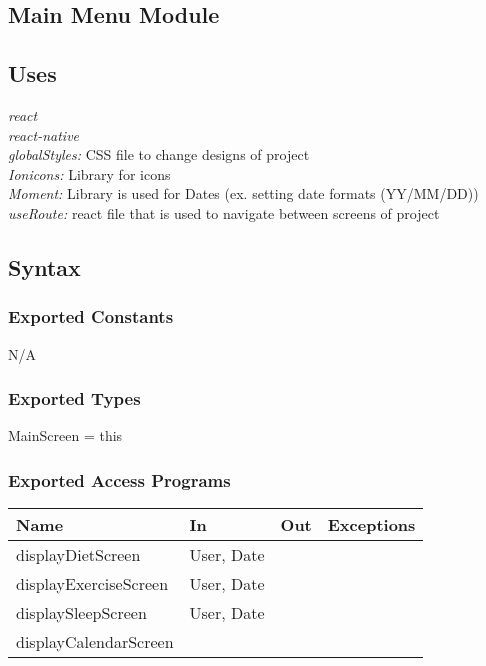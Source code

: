 \documentclass[12pt, titlepage]{article}
\begin{document}
\subsection{Main Menu Module}

\subsection{Uses}
{\textit{react}}\\
{\textit{react-native}}\\
{\textit{globalStyles:} CSS file to change designs of project}\\
{\textit{Ionicons:} Library for icons}\\
{\textit{Moment:} Library is used for Dates (ex. setting date formats (YY/MM/DD))}\\
{\textit{useRoute:} react file that is used to navigate between screens of project}\\

\subsection{Syntax}

\subsubsection{Exported Constants}
N/A

\subsubsection{Exported Types}
MainScreen = this

\subsubsection{Exported Access Programs}

\begin{tabular}{| l | l | l | l |}
	\hline
	{\textbf{Name}} & {\textbf{In}} & {\textbf{Out}} & {\textbf{Exceptions}}\\
	\hline
	{displayDietScreen} & User, Date & & \\
	\hline
	{displayExerciseScreen} & User, Date & & \\
	\hline
	{displaySleepScreen} & User, Date & & \\
	\hline
	{displayCalendarScreen} & & & \\
	\hline
\end{tabular}
\end{document}

